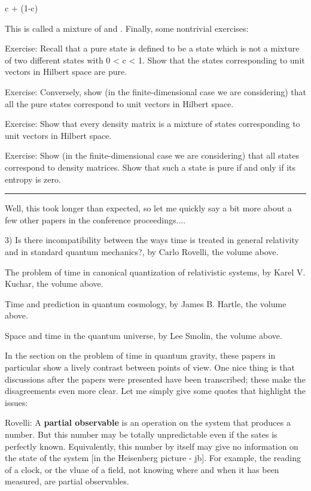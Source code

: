 c \Psi  + (1-c) \Phi 

This is called a mixture of \Psi  and \Phi .  Finally, some
nontrivial exercises:

Exercise: Recall that a pure state is defined to be a state which
is not a mixture of two different states with 0 < c < 1.  Show
that the states corresponding to unit vectors in Hilbert space
are pure.

Exercise: Conversely, show (in the finite-dimensional case we are
considering) that all the pure states correspond to unit vectors
in Hilbert space.

Exercise: Show that every density matrix is a mixture of states
corresponding to unit vectors in Hilbert space.  

Exercise: Show (in the finite-dimensional case we are
considering) that all states correspond to density matrices.
Show that such a state is pure if and only if its entropy is
zero.

\par\noindent\rule{\textwidth}{0.4pt}

Well, this took longer than expected, so let me quickly say a bit
more about a few other papers in the conference proceedings....


3) Is there incompatibility between the ways time is treated in
general relativity and in standard quantum mechanics?, by Carlo
Rovelli, the volume above.

The problem of time in canonical quantization of relativistic
systems, by Karel V. Kuchar, the volume above.

Time and prediction in quantum cosmology, by James B. Hartle, the
volume above.

Space and time in the quantum universe, by Lee Smolin, the volume
above.  


In the section on the problem of time in quantum gravity, these
papers in particular show a lively contrast between points of
view.  One nice thing is that discussions after the papers were
presented have been transcribed; these make the disagreements
even more clear.  Let me simply give some quotes that highlight
the issues:

Rovelli: A \textbf{partial observable} is an operation on the system
that produces a number.  But this number may be totally
unpredictable even if the sates is perfectly known. 
Equivalently, this number by itself may give no information on
the state of the system [in the Heisenberg picture - jb].  For
example, the reading of a clock, or the vluae of a field, not
knowing where and when it has been measured, are partial
observables.  

